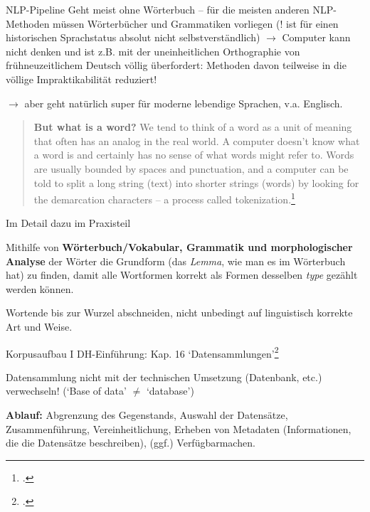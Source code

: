 \documentclass[10pt,a4paper]{article}
\begin{document}
\begin{multicols}{3}
\begin{textbox}{NLP-Pipeline}
Geht meist ohne Wörterbuch -- für die meisten anderen NLP-Methoden müssen Wörterbücher und Grammatiken vorliegen (! ist für einen historischen Sprachstatus absolut nicht selbstverständlich) $\to$ Computer kann nicht denken und ist z.B. mit der uneinheitlichen Orthographie von frühneuzeitlichem Deutsch völlig überfordert: Methoden davon teilweise in die völlige Impraktikabilität reduziert! 

$\to$ aber geht natürlich super für moderne lebendige Sprachen, v.a. Englisch.

\begin{quote}
    \textbf{But what is a word?} We tend to think of a word as a unit of meaning that often has an analog in the real world. \punkti A computer doesn't know what a word is and certainly has no sense of what words might refer to.
    \punkti 
    Words are usually bounded by spaces and punctuation, and a computer can be told to split a long string (text) into shorter strings (words) by looking for the demarcation characters \punkti -- a process called tokenization.\footcite[283]{textvisualization}
\end{quote}
\end{textbox}


\begin{textbox}{Im Detail dazu im Praxisteil}

 Mithilfe von \textbf{Wörterbuch/Vokabular, Grammatik und morphologischer Analyse} der Wörter die Grundform (das \emph{Lemma}, wie man es im Wörterbuch hat) zu finden, damit alle Wortformen korrekt als Formen desselben \emph{type} gezählt werden können.

 Wortende bis zur Wurzel abschneiden, nicht unbedingt auf linguistisch korrekte Art und Weise.



\end{textbox}


\begin{textbox}{Korpusaufbau I}
DH-Einführung: Kap. 16 `Datensammlungen'\footcite{DHIntroDatensammlungen}

Datensammlung nicht mit der technischen Umsetzung (Datenbank, etc.) verwechseln! (`Base of data' $\neq$ `database')

\textbf{Ablauf:} Abgrenzung des Gegenstands, Auswahl der Datensätze, Zusammenführung, Vereinheitlichung, Erheben von Metadaten (Informationen, die die Datensätze beschreiben), (ggf.) Verfügbarmachen.


\end{textbox}
\end{multicols}
\end{document}
